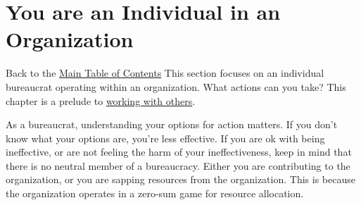 \documentclass{book}
\begin{document}
     \clearpage
     \clearpage
     \clearpage
     \clearpage
     \clearpage
     \clearpage
     \clearpage
     \clearpage

\chapter{You are an Individual in an Organization\label{sec:individual-in-org}}
  {\footnotesize Back to the \hyperref[sec:toc]{Main Table of Contents}}
  \minitoc
    This section focuses on an individual bureaucrat operating within an organization. What actions can you take?  This chapter is a prelude to 
    \hyperref[sec:working-with-other-bureaucrats]{working with others}.
    
    As a bureaucrat, understanding your options for action matters. If you don't know what your options are, you're less effective. If you are ok with being ineffective, or are not feeling the harm of your ineffectiveness, keep in mind that
    there is no neutral member of a bureaucracy. Either you are contributing to the organization, or you are sapping resources from the organization. This is because the organization operates in a zero-sum game for resource allocation.
     \clearpage
     \clearpage
     \clearpage
     \clearpage %
     \clearpage

 \clearpage %
     \clearpage
     \clearpage
     \clearpage
     \clearpage
     \clearpage
     
    \clearpage
     \clearpage
     \clearpage
     \clearpage

 \clearpage %
     \clearpage %
     \clearpage %
     \clearpage %
     \clearpage %
     \clearpage %
     \clearpage 
    
\end{document}
